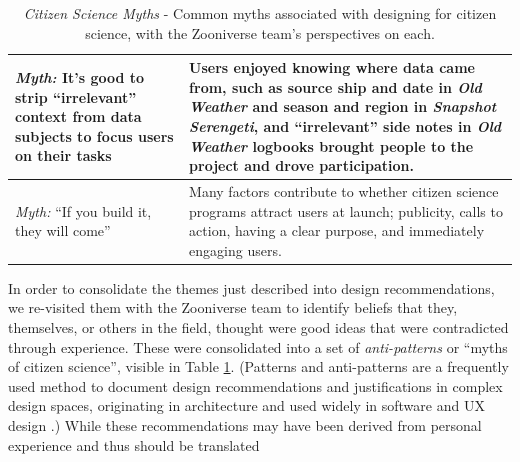 \documentclass{sigchi}
\begin{document}
\begin{table}
\begin{center}
\begin{tabular}{p{4.5cm}p{13cm}}
\hline
\emph{Myth:} It's good to strip ``irrelevant'' context from data subjects to focus users on their tasks & Users enjoyed knowing where data came from, such as source ship and date in \emph{Old Weather} and season and region in \emph{Snapshot Serengeti}, and ``irrelevant'' side notes in \emph{Old Weather} logbooks brought people to the project and drove participation. \\
\hline
\emph{Myth:} ``If you build it, they will come'' &  Many factors contribute to whether citizen science programs attract users at launch; publicity, calls to action, having a clear purpose, and immediately engaging users. \\
\hline
\end{tabular}
\caption{\emph{Citizen Science Myths} - Common myths associated with designing for citizen science, with the Zooniverse team's perspectives on each.}
\label{tbl:myths}
\normalsize
\end{center}
\end{table}



In order to consolidate the themes just described into design recommendations, we re-visited them with the Zooniverse team to identify beliefs that they, themselves, or others in the field, thought were good ideas that were contradicted through experience.  These were consolidated into a set of \emph{anti-patterns} or ``myths of citizen science'', visible in Table \ref{tbl:myths}.  (Patterns and anti-patterns are a frequently used method to  document design recommendations and justifications in complex design spaces, originating in architecture and used widely in software and UX design \cite{alexander2006pattern}.)  While these recommendations may have been derived from personal experience and thus  should be translated
\end{document}
